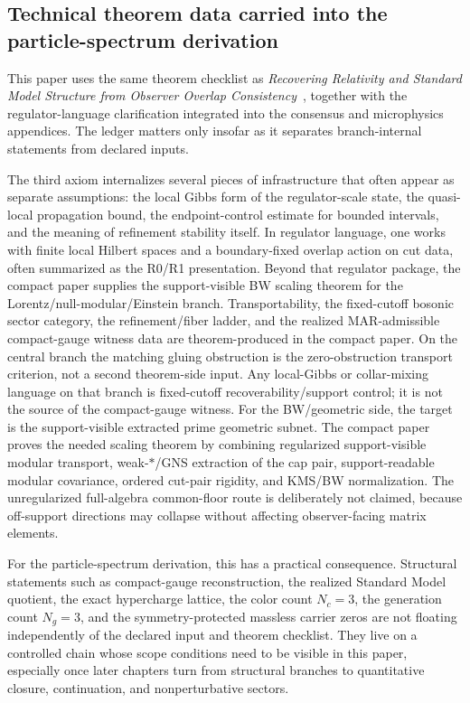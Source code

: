 \documentclass[11pt]{article}
\begin{document}
\subsection{Technical theorem data carried into the particle-spectrum derivation}

This paper uses the same theorem checklist as
\emph{Recovering Relativity and Standard Model Structure from Observer Overlap Consistency}~\cite{ophcompact}, together with
the regulator-language clarification integrated into the consensus and microphysics
appendices. The ledger matters only
insofar as it separates branch-internal statements from declared inputs.

The third axiom internalizes several pieces of infrastructure that often appear as separate
assumptions: the local Gibbs form of the regulator-scale state, the
quasi-local propagation bound, the endpoint-control estimate for bounded intervals, and the
meaning of refinement stability itself. In regulator language, one works with finite local
Hilbert spaces and a boundary-fixed overlap action on cut data, often summarized as the R0/R1
presentation. Beyond that regulator package, the compact paper supplies the support-visible BW
scaling theorem for the Lorentz/null-modular/Einstein branch. Transportability, the fixed-cutoff bosonic sector category, the refinement/fiber
ladder, and the realized MAR-admissible compact-gauge witness data are theorem-produced in the compact paper. On the central branch the matching gluing
obstruction is the zero-obstruction transport criterion, not a second theorem-side input. Any
local-Gibbs or collar-mixing language on that branch is fixed-cutoff recoverability/support
control; it is not the source of the compact-gauge witness.
For the BW/geometric side, the target is the support-visible extracted prime geometric subnet.
The compact paper proves the needed scaling theorem by combining regularized support-visible
modular transport, weak-\(*\)/GNS extraction of the cap pair, support-readable modular covariance,
ordered cut-pair rigidity, and KMS/BW normalization. The unregularized full-algebra common-floor
route is deliberately not claimed, because off-support directions may collapse without affecting
observer-facing matrix elements.

For the particle-spectrum derivation, this has a practical consequence. Structural statements such
as compact-gauge reconstruction, the realized Standard Model quotient, the exact hypercharge
lattice, the color count \(N_c=3\), the generation count \(N_g=3\), and the symmetry-protected
massless carrier zeros are not floating independently of the declared input and theorem checklist. They live on a
controlled chain whose scope conditions need to be visible in this paper,
especially once later chapters turn from structural branches to quantitative closure, continuation, and
nonperturbative sectors.
\end{document}
